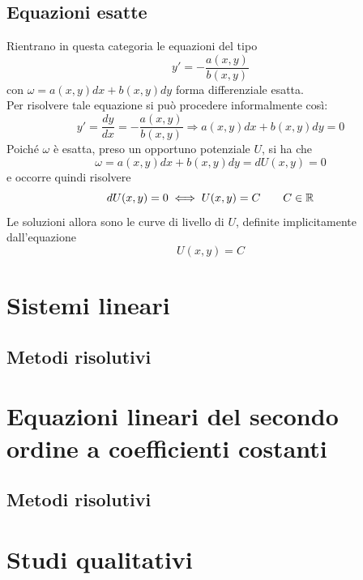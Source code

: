 \subsection{Equazioni esatte}
Rientrano in questa categoria le equazioni del tipo
\begin{equation}
    y'=-\frac{a(x,y)}{b(x,y)}
\end{equation}
con $\omega=a(x,y)dx+b(x,y)dy$ forma differenziale esatta.\\
Per risolvere tale equazione si può procedere informalmente così:
\begin{equation}
    y'=\frac{dy}{dx}=-\frac{a(x,y)}{b(x,y)} \Rightarrow a(x,y)dx+b(x,y)dy=0
\end{equation}
Poiché $\omega$ è esatta, preso un opportuno potenziale $U$, si ha che
\begin{equation}
\omega= a(x,y)dx+b(x,y)dy = dU(x,y)= 0
\end{equation}
e occorre quindi risolvere
\begin{equation}
    dU(x,y)=0 \iff U(x,y)=C \qquad C\in \mathbb{R}
\end{equation}
Le soluzioni allora sono le curve di livello di $U$, definite implicitamente dall'equazione
\begin{equation}
    U(x,y)=C
\end{equation}
\section{Sistemi lineari}
\subsection{Metodi risolutivi}
\section{Equazioni lineari del secondo ordine a coefficienti costanti}
\subsection{Metodi risolutivi}
\section{Studi qualitativi}